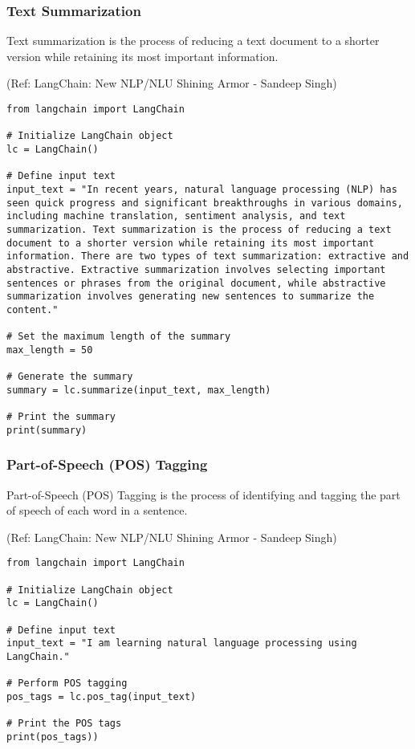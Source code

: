 \begin{frame}[fragile]\frametitle{Text Summarization}

Text summarization is the process of reducing a text document to a shorter version while retaining its most important information.

{\tiny (Ref: LangChain: New NLP/NLU Shining Armor - Sandeep Singh)}

\begin{lstlisting}
from langchain import LangChain

# Initialize LangChain object
lc = LangChain()

# Define input text
input_text = "In recent years, natural language processing (NLP) has seen quick progress and significant breakthroughs in various domains, including machine translation, sentiment analysis, and text summarization. Text summarization is the process of reducing a text document to a shorter version while retaining its most important information. There are two types of text summarization: extractive and abstractive. Extractive summarization involves selecting important sentences or phrases from the original document, while abstractive summarization involves generating new sentences to summarize the content."

# Set the maximum length of the summary
max_length = 50

# Generate the summary
summary = lc.summarize(input_text, max_length)

# Print the summary
print(summary)
\end{lstlisting}	  

\end{frame}

\begin{frame}[fragile]\frametitle{Part-of-Speech (POS) Tagging}

Part-of-Speech (POS) Tagging is the process of identifying and tagging the part of speech of each word in a sentence. 

{\tiny (Ref: LangChain: New NLP/NLU Shining Armor - Sandeep Singh)}

\begin{lstlisting}
from langchain import LangChain

# Initialize LangChain object
lc = LangChain()

# Define input text
input_text = "I am learning natural language processing using LangChain."

# Perform POS tagging
pos_tags = lc.pos_tag(input_text)

# Print the POS tags
print(pos_tags))
\end{lstlisting}	  

\end{frame}

